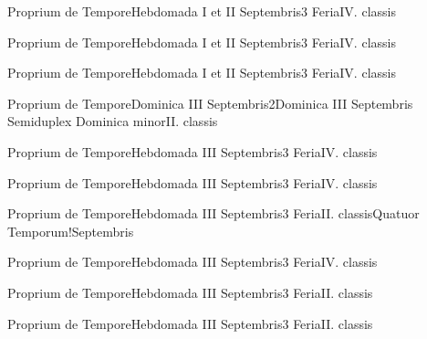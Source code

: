 \documentclass[liber-responsorialis_temporale.tex]{subfiles}
\begin{document}
	{Proprium de Tempore}{Hebdomada I et II Septembris}{3}{}
	{Feria}{IV. classis}{}
	{}
	{}

	{Proprium de Tempore}{Hebdomada I et II Septembris}{3}{}
	{Feria}{IV. classis}{}
	{}
	{}

	{Proprium de Tempore}{Hebdomada I et II Septembris}{3}{}
	{Feria}{IV. classis}{}
	{}
	{}

\vspace{\baselineskip}

	{Proprium de Tempore}{Dominica III Septembris}{2}{Dominica III Septembris}
	{Semiduplex Dominica minor}{II. classis}{}
	{}
	{}
\pagebreak
{}
\sixlinesvspace
\pagebreak
{}
\pagebreak
{}
\vspace{2\baselineskip}

	{Proprium de Tempore}{Hebdomada III Septembris}{3}{}
	{Feria}{IV. classis}{}
	{}
	{}


	{Proprium de Tempore}{Hebdomada III Septembris}{3}{}
	{Feria}{IV. classis}{}
	{}
	{}

	{Proprium de Tempore}{Hebdomada III Septembris}{3}{}
	{Feria}{II. classis}{Quatuor Temporum!Septembris}
	{}
	{}

	{Proprium de Tempore}{Hebdomada III Septembris}{3}{}
	{Feria}{IV. classis}{}
	{}
	{}

	{Proprium de Tempore}{Hebdomada III Septembris}{3}{}
	{Feria}{II. classis}{}
	{}
	{}

	{Proprium de Tempore}{Hebdomada III Septembris}{3}{}
	{Feria}{II. classis}{}
	{}
	{}
\end{document}
